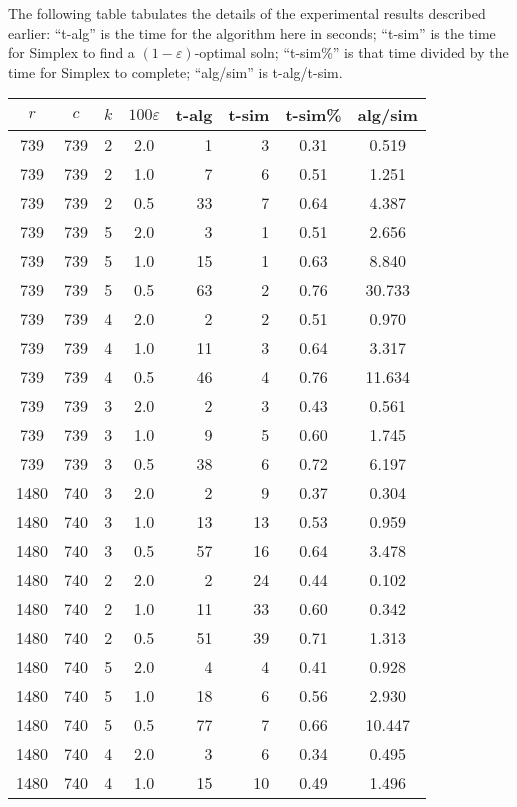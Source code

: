 \documentclass[11pt]{svjour3} \usepackage{fullpage}
\newcommand{\eps}{\varepsilon}
\begin{document}
The following table tabulates the details of the experimental results
described earlier:
``t-alg'' is the time for the algorithm here in seconds;
``t-sim'' is the time for Simplex to find a $(1-\eps)$-optimal soln;
``t-sim\%'' is that time divided by the time for Simplex to complete;
``alg/sim'' is t-alg/t-sim.
{

\scriptsize

\bigskip
\begin{tabular}[t]{@{}|c@{~~}c@{~~}c@{~}c@{~}r@{~}r@{~}c@{~}c|} \hline
$r$	& $c$	& $k$	& $100\eps$	& t-alg	& t-sim	& t-sim\% & alg/sim \\ \hline
739 & 739 & 2 & 2.0 & 1 & 3 & 0.31 & 0.519
\\ 739 & 739 & 2 & 1.0 & 7 & 6 & 0.51 & 1.251
\\ 739 & 739 & 2 & 0.5 & 33 & 7 & 0.64 & 4.387
\\ 739 & 739 & 5 & 2.0 & 3 & 1 & 0.51 & 2.656
\\ 739 & 739 & 5 & 1.0 & 15 & 1 & 0.63 & 8.840
\\ 739 & 739 & 5 & 0.5 & 63 & 2 & 0.76 & 30.733
\\ 739 & 739 & 4 & 2.0 & 2 & 2 & 0.51 & 0.970
\\ 739 & 739 & 4 & 1.0 & 11 & 3 & 0.64 & 3.317
\\ 739 & 739 & 4 & 0.5 & 46 & 4 & 0.76 & 11.634
\\ 739 & 739 & 3 & 2.0 & 2 & 3 & 0.43 & 0.561
\\ 739 & 739 & 3 & 1.0 & 9 & 5 & 0.60 & 1.745
\\ 739 & 739 & 3 & 0.5 & 38 & 6 & 0.72 & 6.197
\\ 1480 & 740 & 3 & 2.0 & 2 & 9 & 0.37 & 0.304
\\ 1480 & 740 & 3 & 1.0 & 13 & 13 & 0.53 & 0.959
\\ 1480 & 740 & 3 & 0.5 & 57 & 16 & 0.64 & 3.478
\\ 1480 & 740 & 2 & 2.0 & 2 & 24 & 0.44 & 0.102
\\ 1480 & 740 & 2 & 1.0 & 11 & 33 & 0.60 & 0.342
\\ 1480 & 740 & 2 & 0.5 & 51 & 39 & 0.71 & 1.313
\\ 1480 & 740 & 5 & 2.0 & 4 & 4 & 0.41 & 0.928
\\ 1480 & 740 & 5 & 1.0 & 18 & 6 & 0.56 & 2.930
\\ 1480 & 740 & 5 & 0.5 & 77 & 7 & 0.66 & 10.447
\\ 1480 & 740 & 4 & 2.0 & 3 & 6 & 0.34 & 0.495
\\ 1480 & 740 & 4 & 1.0 & 15 & 10 & 0.49 & 1.496

\end{tabular}}
\end{document}
